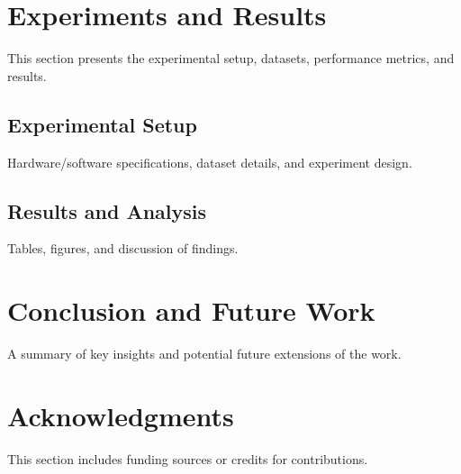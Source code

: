 \documentclass[a4paper,12pt]{article}
\begin{document}
\section{Experiments and Results}
\noindent This section presents the experimental setup, datasets, performance metrics, and results.

\subsection{Experimental Setup}
Hardware/software specifications, dataset details, and experiment design.

\subsection{Results and Analysis}
Tables, figures, and discussion of findings.

\section{Conclusion and Future Work}
\noindent A summary of key insights and potential future extensions of the work.

\section*{Acknowledgments}
\noindent This section includes funding sources or credits for contributions.



\end{document}
